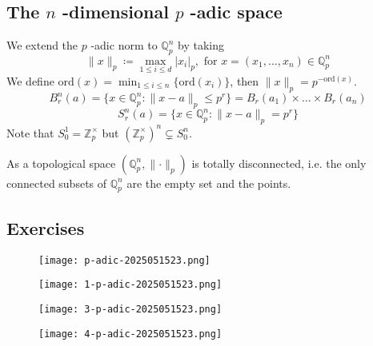 \subsection{The \texorpdfstring{$n$}{n} -dimensional \texorpdfstring{$p$}{p} -adic space}

We extend the $p$ -adic norm to $\mathbb{Q}_{p}^{n}$ by taking
\[
\lVert x \rVert _{p}\coloneqq \max_{1\leq i\leq d}\lvert x_i \rvert _{p},\text{ for }x=(x_1,\dots,x_n)\in \mathbb{Q}^{n}_{p}
\]
We define $\mathrm{ord}(x)=\min_{1\leq i\leq n}\{ \mathrm{ord}(x_i) \}$, then $\lVert x \rVert_{p}=p^{-\mathrm{ord}(x)}$.
\[
B_{r}^{n}(a)=\{ x\in \mathbb{Q}^{n}_{p}:\lVert x-a \rVert _{p}\leq p^{r} \}=B_{r}(a_1)\times \dots \times B_{r}(a_{n})
\]
\[
S_{r}^{n}(a)=\{ x\in \mathbb{Q}_{p}^{n}:\lVert x-a \rVert _{p}=p^{r} \}
\]
Note that $S^{1}_{0}=\mathbb{Z}_{p}^{\times}$ but $(\mathbb{Z}_{p}^{\times})^{n}\subsetneq S_0^{n}$.

As a topological space $(\mathbb{Q}_{p}^{n},\lVert \cdot  \rVert_{p})$ is totally disconnected, i.e. the only connected subsets of $\mathbb{Q}^{n}_{p}$ are the empty set and the points.

\subsection{Exercises}

\begin{exercise}
\begin{figure}[H]
\centering
\texttt{[image: p-adic-2025051523.png]}
\label{}
\end{figure}
\begin{figure}[H]
\centering
\texttt{[image: 1-p-adic-2025051523.png]}
\label{}
\end{figure}
\end{exercise}
\begin{figure}[H]
\centering
\texttt{[image: 3-p-adic-2025051523.png]}
\label{}
\end{figure}
\begin{figure}[H]
\centering
\texttt{[image: 4-p-adic-2025051523.png]}
\label{}
\end{figure}
